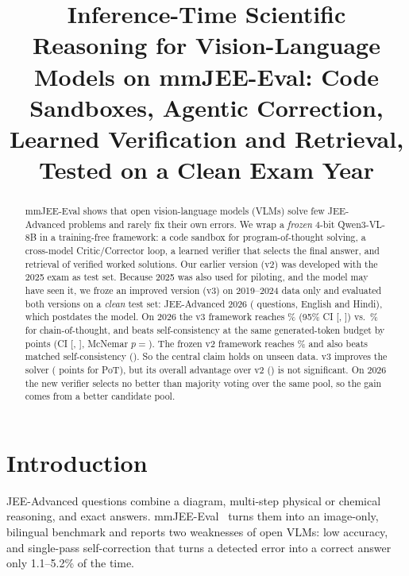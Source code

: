\documentclass[conference]{IEEEtran}
\begin{document}
\title{Inference-Time Scientific Reasoning for Vision-Language Models on mmJEE-Eval:
Code Sandboxes, Agentic Correction, Learned Verification and Retrieval, Tested on a Clean Exam Year}
\author{
}
\maketitle

\begin{abstract}
mmJEE-Eval shows that open vision-language models (VLMs) solve few JEE-Advanced problems and
rarely fix their own errors. We wrap a \emph{frozen} 4-bit Qwen3-VL-8B in a training-free
framework: a code sandbox for program-of-thought solving, a cross-model Critic/Corrector loop, a
learned verifier that selects the final answer, and retrieval of verified worked solutions. Our
earlier version (v2) was developed with the 2025 exam as test set. Because 2025 was also used for
piloting, and the model may have seen it, we froze an improved version (v3) on 2019--2024 data
only and evaluated both versions on a \emph{clean} test set: JEE-Advanced 2026 (\NTest{} questions,
English and Hindi), which postdates the model. On 2026 the v3 framework reaches \ThreeAcc\% (95\%
CI [\ThreeLo, \ThreeHi]) vs.\ \ThreeBase\% for chain-of-thought, and beats self-consistency at
the same generated-token budget by \ThreeVsSc{} points (CI [\ThreeVsScLo, \ThreeVsScHi], McNemar
$p{=}$\ThreeVsScP). The frozen v2 framework reaches \TwoAcc\% and also beats matched
self-consistency (\TwoVsSc{}). So the central claim holds on unseen data. v3 improves the solver
(\PotVsDiff{} points for PoT), but its overall advantage over v2 (\VsDiff) is not significant.
On 2026 the new verifier selects no better than majority voting over the same pool, so the gain
comes from a better candidate pool.
\end{abstract}

\section{Introduction}
JEE-Advanced questions combine a diagram, multi-step physical or chemical reasoning, and exact
answers. mmJEE-Eval~\cite{mmjee} turns them into an image-only, bilingual benchmark and reports
two weaknesses of open VLMs: low accuracy, and single-pass self-correction that turns a detected
error into a correct answer only 1.1--5.2\% of the time.
\end{document}
